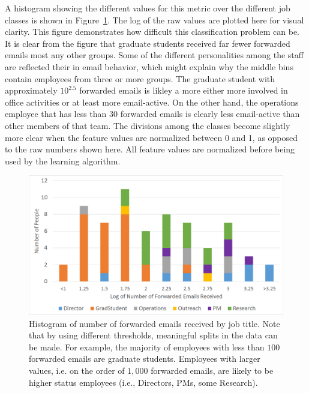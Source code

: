 \documentclass[12pt]{report}
\begin{document}
A histogram showing the different values for this metric over the different job classes is shown in Figure~\ref{fig:traffic_ex_hist}.
The log of the raw values are plotted here for visual clarity.
This figure demonstrates how difficult this classification problem can be.
It is clear from the figure that graduate students received far fewer forwarded emails most any other groups.
Some of the different personalities among the staff are reflected their in email behavior, which might explain why the middle bins contain employees from three or more groups.
The graduate student with approximately $10^{2.5}$ forwarded emails is likley a more either more involved in office activities or at least more email-active.  
On the other hand, the operations employee that has less than $30$ forwarded emails is clearly less email-active than other members of that team.
The divisions among the classes become slightly more clear when the feature values are normalized between 0 and 1, as opposed to the raw numbers shown here.
All feature values are normalized before being used by the learning algorithm.
\begin{figure}[t]
    \centering
        \includegraphics[width=\columnwidth,trim={0mm 0mm 0mm 0mm},clip]{FW_hist}
        \caption[Forwarded emails received histogram]{Histogram of number of forwarded emails received by job title.  Note that by using different thresholds, meaningful splits in the data can be made.  For example, the majority of employees with less than $100$ forwarded emails are graduate students. Employees with larger values, i.e. on the order of $1,000$ forwarded emails, are likely to be higher status employees (i.e., Directors, PMs, some Research).}
        \label{fig:traffic_ex_hist}
\end{figure}
\end{document}
